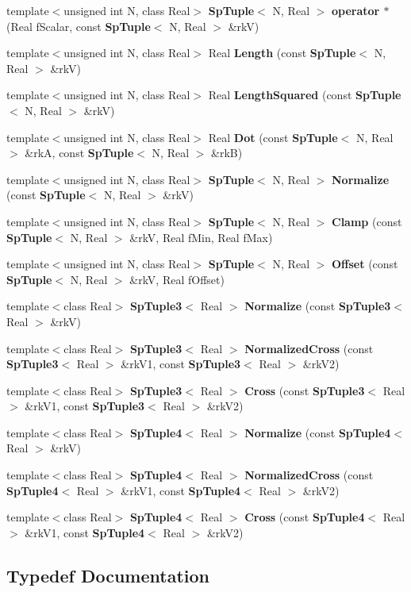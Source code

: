 \begin{CompactItemize}
template$<$unsigned int N, class Real$>$ {\bf Sp\-Tuple}$<$ N, Real $>$ {\bf operator $\ast$} (Real f\-Scalar, const {\bf Sp\-Tuple}$<$ N, Real $>$ \&rk\-V)
\item 
template$<$unsigned int N, class Real$>$ Real {\bf Length} (const {\bf Sp\-Tuple}$<$ N, Real $>$ \&rk\-V)
\item 
template$<$unsigned int N, class Real$>$ Real {\bf Length\-Squared} (const {\bf Sp\-Tuple}$<$ N, Real $>$ \&rk\-V)
\item 
template$<$unsigned int N, class Real$>$ Real {\bf Dot} (const {\bf Sp\-Tuple}$<$ N, Real $>$ \&rk\-A, const {\bf Sp\-Tuple}$<$ N, Real $>$ \&rk\-B)
\item 
template$<$unsigned int N, class Real$>$ {\bf Sp\-Tuple}$<$ N, Real $>$ {\bf Normalize} (const {\bf Sp\-Tuple}$<$ N, Real $>$ \&rk\-V)
\item 
template$<$unsigned int N, class Real$>$ {\bf Sp\-Tuple}$<$ N, Real $>$ {\bf Clamp} (const {\bf Sp\-Tuple}$<$ N, Real $>$ \&rk\-V, Real f\-Min, Real f\-Max)
\item 
template$<$unsigned int N, class Real$>$ {\bf Sp\-Tuple}$<$ N, Real $>$ {\bf Offset} (const {\bf Sp\-Tuple}$<$ N, Real $>$ \&rk\-V, Real f\-Offset)
\item 
template$<$class Real$>$ {\bf Sp\-Tuple3}$<$ Real $>$ {\bf Normalize} (const {\bf Sp\-Tuple3}$<$ Real $>$ \&rk\-V)
\item 
template$<$class Real$>$ {\bf Sp\-Tuple3}$<$ Real $>$ {\bf Normalized\-Cross} (const {\bf Sp\-Tuple3}$<$ Real $>$ \&rk\-V1, const {\bf Sp\-Tuple3}$<$ Real $>$ \&rk\-V2)
\item 
template$<$class Real$>$ {\bf Sp\-Tuple3}$<$ Real $>$ {\bf Cross} (const {\bf Sp\-Tuple3}$<$ Real $>$ \&rk\-V1, const {\bf Sp\-Tuple3}$<$ Real $>$ \&rk\-V2)
\item 
template$<$class Real$>$ {\bf Sp\-Tuple4}$<$ Real $>$ {\bf Normalize} (const {\bf Sp\-Tuple4}$<$ Real $>$ \&rk\-V)
\item 
template$<$class Real$>$ {\bf Sp\-Tuple4}$<$ Real $>$ {\bf Normalized\-Cross} (const {\bf Sp\-Tuple4}$<$ Real $>$ \&rk\-V1, const {\bf Sp\-Tuple4}$<$ Real $>$ \&rk\-V2)
\item 
template$<$class Real$>$ {\bf Sp\-Tuple4}$<$ Real $>$ {\bf Cross} (const {\bf Sp\-Tuple4}$<$ Real $>$ \&rk\-V1, const {\bf Sp\-Tuple4}$<$ Real $>$ \&rk\-V2)
\end{CompactItemize}


\subsection{Typedef Documentation}
